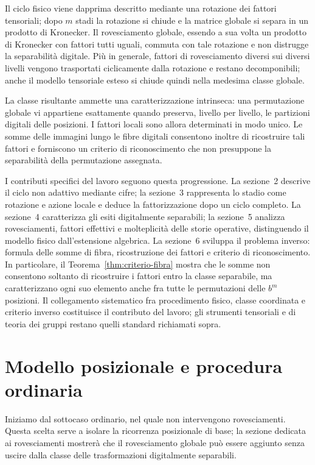 	Il ciclo fisico viene dapprima descritto mediante una rotazione dei fattori
	tensoriali; dopo \(m\) stadi la rotazione si chiude e la matrice globale si
	separa in un prodotto di Kronecker. Il rovesciamento globale, essendo a sua
	volta un prodotto di Kronecker con fattori tutti uguali, commuta con tale
	rotazione e non distrugge la separabilità digitale. Più in generale, fattori
	di rovesciamento diversi sui diversi livelli vengono trasportati ciclicamente
	dalla rotazione e restano decomponibili; anche il modello tensoriale esteso si
	chiude quindi nella medesima classe globale.

	La classe risultante ammette una caratterizzazione intrinseca: una
	permutazione globale vi appartiene esattamente quando preserva, livello per
	livello, le partizioni digitali delle posizioni. I fattori locali sono allora
	determinati in modo unico. Le somme delle immagini lungo le fibre digitali
	consentono inoltre di ricostruire tali fattori e forniscono un criterio di
	riconoscimento che non presuppone la separabilità della permutazione assegnata.

	I contributi specifici del lavoro seguono questa progressione. La sezione~2
	descrive il ciclo non adattivo mediante cifre; la sezione~3 rappresenta lo
	stadio come rotazione e azione locale e deduce la fattorizzazione dopo un
	ciclo completo. La sezione~4 caratterizza gli esiti digitalmente separabili;
	la sezione~5 analizza rovesciamenti, fattori effettivi e molteplicità delle
	storie operative, distinguendo il modello fisico dall'estensione algebrica.
	La sezione~6 sviluppa il problema inverso: formula delle somme di fibra,
	ricostruzione dei fattori e criterio di riconoscimento. In particolare, il
	Teorema~\ref{thm:criterio-fibra} mostra che le somme non consentono soltanto
	di ricostruire i fattori entro la classe separabile, ma caratterizzano ogni
	suo elemento anche fra tutte le permutazioni delle \(b^m\) posizioni.
	Il collegamento sistematico fra procedimento fisico, classe coordinata e
	criterio inverso costituisce il contributo del lavoro; gli strumenti
	tensoriali e di teoria dei gruppi restano quelli standard richiamati sopra.

	\section{Modello posizionale e procedura ordinaria}

	Iniziamo dal sottocaso ordinario, nel quale non intervengono rovesciamenti.
	Questa scelta serve a isolare la ricorrenza posizionale di base; la sezione
	dedicata ai rovesciamenti mostrerà che il rovesciamento globale può essere aggiunto senza
	uscire dalla classe delle trasformazioni digitalmente separabili.

